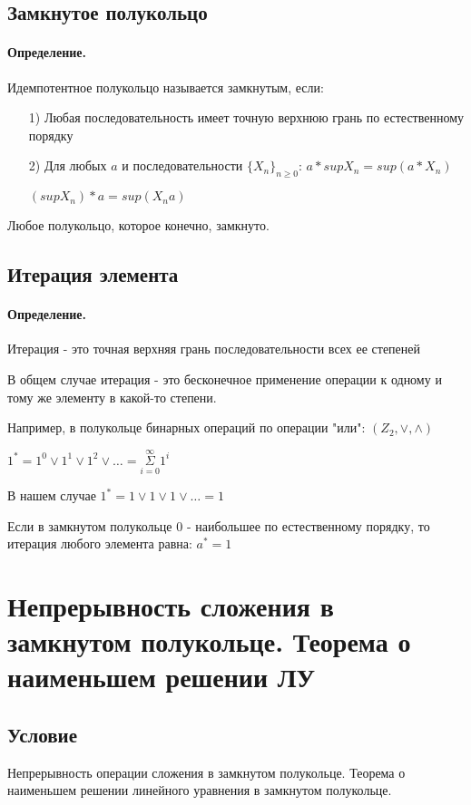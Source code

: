\documentclass{report}
\begin{document}
\subsection{Замкнутое полукольцо}
\paragraph*{Определение.}
Идемпотентное полукольцо называется замкнутым, если:
\begin{itemize}
	\item[1)] Любая последовательность имеет точную верхнюю грань по естественному порядку
	\item[2)] Для любых $a$ и последовательности $\{X_n\}_{n \geq 0}$:\newline
		$a*supX_n = sup(a*X_n)$

		$(supX_n)*a = sup(X_n a)$
\end{itemize}


Любое полукольцо, которое конечно, замкнуто.

\subsection{Итерация элемента}
\paragraph*{Определение.} Итерация - это точная верхняя грань последовательности всех ее степеней


В общем случае итерация - это бесконечное применение операции к одному и тому же элементу в какой-то степени.

Например, в полукольце бинарных операций по операции "или":\newline
$(Z_2, \lor, \land)$

$1^*=1^0 \lor 1^1 \lor 1^2 \lor \ldots = \underset{i=0}{\overset{\infty}{\Sigma}}1^{i}$


В нашем случае $1^* = 1 \lor 1 \lor 1 \lor \dots = 1$

\medskip

Если в замкнутом полукольце $0$ - наибольшее по естественному порядку, то
итерация любого элемента равна: $a^* = 1$

\newpage

\section{Непрерывность сложения в замкнутом полукольце. Теорема о наименьшем решении ЛУ}
\subsection{Условие}
Непрерывность операции сложения в замкнутом полукольце. Теорема о наименьшем
решении линейного уравнения в замкнутом полукольце.
\end{document}
